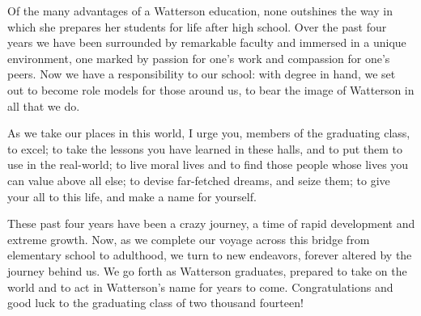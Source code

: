 \documentclass{report}
\begin{document}
Of the many advantages of a Watterson education, none outshines the way in
which she prepares her students for life after high school. Over the past four
years we have been surrounded by remarkable faculty and immersed in a unique
environment, one marked by passion for one's work and compassion for one's
peers. Now we have a responsibility to our school: with degree in hand, we set
out to become role models for those around us, to bear the image of Watterson
in all that we do.

As we take our places in this world, I urge you, members of the graduating
class, to excel; to take the lessons you have learned in these halls, and to
put them to use in the real-world; to live moral lives and to find those people
whose lives you can value above all else; to devise far-fetched dreams, and
seize them; to give your all to this life, and make a name for yourself.

These past four years have been a crazy journey, a time of rapid development
and extreme growth. Now, as we complete our voyage across this bridge from
elementary school to adulthood, we turn to new endeavors, forever altered by
the journey behind us. We go forth as Watterson graduates, prepared to take on
the world and to act in Watterson's name for years to come. Congratulations and
good luck to the graduating class of two thousand fourteen!
\end{document}
